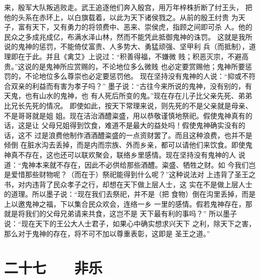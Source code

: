 \documentclass[12pt,UTF8]{ctexbook}
\begin{document}
来，殷军大队叛逃败走。武王追逐他们奔入殷宫，用万年梓株折断了纣王头， 
把他的头系在赤环上，以白旗载着，以此为天下诸侯戮之。从前的殷王纣贵 
为天子，富有天下，又有勇力的将领费中、恶来、崇侯虎，指顾之间即可杀 
人。他的民众之多成兆成亿，布满水泽山林，然而不能凭此抵御鬼神的诛罚。 
这就是我所说的鬼神的惩罚，不能倚仗富贵、人多势大、勇猛顽强、坚甲利 
兵（而抵制），道理即在于此。并且《禽艾》上说过：“积善得福，不嫌微 
贱；积恶灭宗，不避高贵。”这说的是鬼神所应赏赐的，不论地位多么微贱 
也必定要赏赐他；鬼神所要惩罚的，不论地位多么尊崇也必定要惩罚他。 
现在坚持没有鬼神的人说：“抑或不符合双亲的利益而有害为孝子吗？” 
墨子说：“古往今来所说的鬼神，没有别的，有天鬼，也有山水的鬼神，也 
有人死后所变的鬼。”现在存在儿子比父亲先死、弟弟比兄长先死的情况。 
即使如此，按天下常理来说，则先死的不是父亲就是母亲、不是哥哥就是姐 
姐。现在洁治酒醴粢盛，用以恭敬谨慎地祭祀。假使鬼神真有的话，这是让 
父母兄姐得到饮食，难道不是最大的益处吗！假使鬼神确实没有的话，这不 
过是浪费他制作酒酒醴粢盛的一点资财罢了。而且这种浪费，也并不是倾倒 
在脏水沟去丢掉，而是内而宗族、外而乡亲，都可以请他们来饮食。即使鬼 
神真不存在，这也还可以联欢聚会，联络乡里感情。现在坚持没有鬼神的人 
说道：“鬼神本来就不存在，因此不必供给那些酒醴。粢盛、牺牲之财。如 
今我们岂是爱惜那些财物呢？（而在于）祭祀能得到什么呢？”这种说法对 
上违背了圣王之书，对内违背了民众孝子之行，却想在天下做上层人士，这 
实在不是做上层人士的道理。所以墨子说：“现在我们去祭祀，并不是（把 
食物）倒在沟里丢掉，而是上以邀鬼神之福，下以集合民众欢会，连络一乡 
一里的感情。假若鬼神存在，那就是将我们的父母兄弟请来共食，这岂不是 
天下最有利的事吗？” 
所以墨子说：“现在天下的王公大人士君子，如果心中确实想求兴天下 
之利，除天下之害，那么对于鬼神的存在，将不可不加以尊重表彰，这即是 
圣王之道。” 

\chapter{二十七　　非乐}
\end{document}
